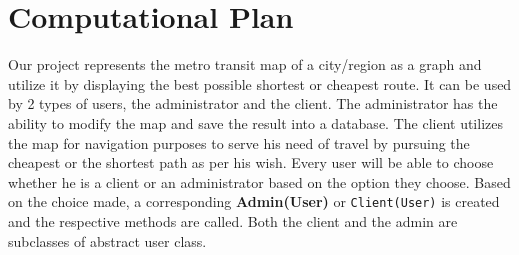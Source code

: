 \documentclass[fontsize=11pt]{article}
\begin{document}
    \section*{Computational Plan}
    Our project represents the metro transit map of a city/region as a graph and utilize it by displaying the best possible shortest or cheapest route. It can be used by 2 types of users, the administrator and the client. The administrator has the ability to modify the map and save the result into a database. The client utilizes the map for navigation purposes to serve his need of travel by pursuing the cheapest or the shortest path as per his wish. Every user will be able to choose whether he is a client or an administrator based on the option they choose. Based on the choice made, a corresponding \textbf{Admin(User)} or \texttt{Client(User)} is created and the respective methods are called. Both the client and the admin are subclasses of abstract user class.
\end{document}

